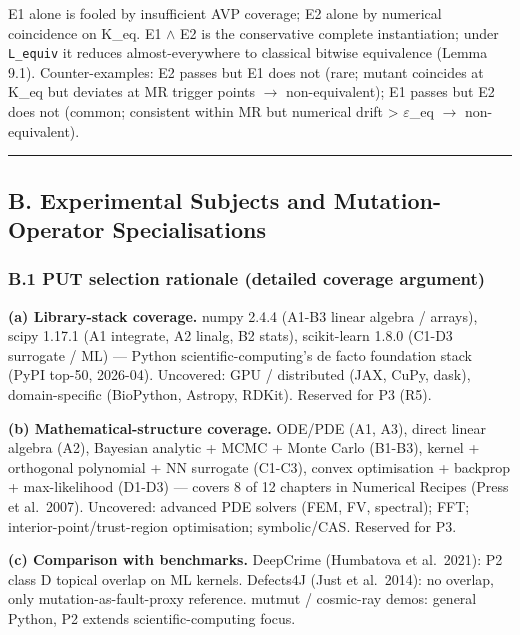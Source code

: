\documentclass[review,12pt,authoryear]{elsarticle}
\begin{document}
E1 alone is fooled by insufficient AVP coverage; E2 alone by numerical
coincidence on K\_eq. E1 $\wedge$ E2 is the conservative complete
instantiation; under \texttt{L\_equiv} it reduces almost-everywhere to
classical bitwise equivalence (Lemma 9.1). Counter-examples: E2 passes
but E1 does not (rare; mutant coincides at K\_eq but deviates at MR
trigger points $\to$ non-equivalent); E1 passes but E2 does not (common;
consistent within MR but numerical drift \textgreater{} $\varepsilon$\_eq $\to$
non-equivalent).

\begin{center}\rule{0.5\linewidth}{0.5pt}\end{center}

\subsection{B. Experimental Subjects and Mutation-Operator
Specialisations}\label{b.-experimental-subjects-and-mutation-operator-specialisations}

\subsubsection{B.1 PUT selection rationale (detailed coverage
argument)}\label{b.1-put-selection-rationale-detailed-coverage-argument}

\textbf{(a) Library-stack coverage.} numpy 2.4.4 (A1-B3 linear algebra /
arrays), scipy 1.17.1 (A1 integrate, A2 linalg, B2 stats), scikit-learn
1.8.0 (C1-D3 surrogate / ML) --- Python scientific-computing's de facto
foundation stack (PyPI top-50, 2026-04). Uncovered: GPU / distributed
(JAX, CuPy, dask), domain-specific (BioPython, Astropy, RDKit). Reserved
for P3 (R5).

\textbf{(b) Mathematical-structure coverage.} ODE/PDE (A1, A3), direct
linear algebra (A2), Bayesian analytic + MCMC + Monte Carlo (B1-B3),
kernel + orthogonal polynomial + NN surrogate (C1-C3), convex
optimisation + backprop + max-likelihood (D1-D3) --- covers 8 of 12
chapters in Numerical Recipes (Press et al.~2007). Uncovered: advanced
PDE solvers (FEM, FV, spectral); FFT; interior-point/trust-region
optimisation; symbolic/CAS. Reserved for P3.

\textbf{(c) Comparison with benchmarks.} DeepCrime (Humbatova et
al.~2021): P2 class D topical overlap on ML kernels. Defects4J (Just et
al.~2014): no overlap, only mutation-as-fault-proxy reference. mutmut /
cosmic-ray demos: general Python, P2 extends scientific-computing focus.
\end{document}
